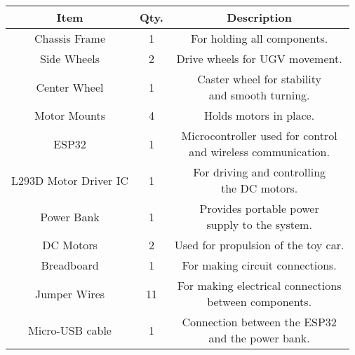 \begin{tabular}[12pt]{ |c| c| c|}
    \hline
    \textbf{Item} & \textbf{Qty.} & \textbf{Description} \\ 
    \hline
    Chassis Frame & 1 & For holding all components. \\
    \hline
    Side Wheels & 2 & Drive wheels for UGV movement. \\ 
    \hline
    Center Wheel & 1 & \makecell{Caster wheel for stability \\ and smooth turning.} \\
    \hline
    Motor Mounts & 4 & Holds motors in place. \\
    \hline
    ESP32 & 1 & \makecell{Microcontroller used for control \\ and wireless communication.} \\
    \hline
    L293D Motor Driver IC & 1 & \makecell{For driving and controlling \\ the DC motors.} \\ 
    \hline
    Power Bank & 1 & \makecell{Provides portable power \\ supply to the system.} \\
    \hline
    DC Motors & 2 & Used for propulsion of the toy car. \\
    \hline
    Breadboard & 1 & For making circuit connections. \\
    \hline
    Jumper Wires & 11 & \makecell{For making electrical connections \\ between components.} \\
    \hline
    Micro-USB cable & 1 & \makecell{Connection between the ESP32 \\ and the power bank.} \\
    \hline
    \end{tabular}

